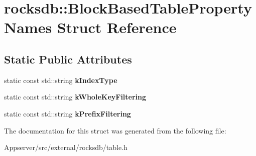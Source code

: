 \hypertarget{structrocksdb_1_1BlockBasedTablePropertyNames}{}\section{rocksdb\+:\+:Block\+Based\+Table\+Property\+Names Struct Reference}
\label{structrocksdb_1_1BlockBasedTablePropertyNames}
\subsection*{Static Public Attributes}
\begin{DoxyCompactItemize}
\item 
static const std\+::string {\bfseries k\+Index\+Type}\hypertarget{structrocksdb_1_1BlockBasedTablePropertyNames_a68daf9a0361536f691e0a3e2130c2f05}{}\label{structrocksdb_1_1BlockBasedTablePropertyNames_a68daf9a0361536f691e0a3e2130c2f05}

\item 
static const std\+::string {\bfseries k\+Whole\+Key\+Filtering}\hypertarget{structrocksdb_1_1BlockBasedTablePropertyNames_aa2616d9324ec0ff90fc797f7fd93eb54}{}\label{structrocksdb_1_1BlockBasedTablePropertyNames_aa2616d9324ec0ff90fc797f7fd93eb54}

\item 
static const std\+::string {\bfseries k\+Prefix\+Filtering}\hypertarget{structrocksdb_1_1BlockBasedTablePropertyNames_a58b9db16091e5cdf6d790d4616b26562}{}\label{structrocksdb_1_1BlockBasedTablePropertyNames_a58b9db16091e5cdf6d790d4616b26562}

\end{DoxyCompactItemize}


The documentation for this struct was generated from the following file\+:\begin{DoxyCompactItemize}
\item 
Appserver/src/external/rocksdb/table.\+h\end{DoxyCompactItemize}
